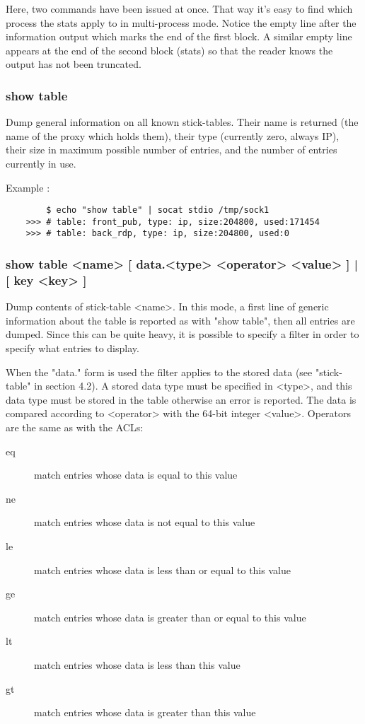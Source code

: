     Here, two commands have been issued at once. That way it's easy to find
    which process the stats apply to in multi-process mode. Notice the empty
    line after the information output which marks the end of the first block.
    A similar empty line appears at the end of the second block (stats) so that
    the reader knows the output has not been truncated.

\subsubsection[show table]{show table}
  Dump general information on all known stick-tables. Their name is returned
  (the name of the proxy which holds them), their type (currently zero, always
  IP), their size in maximum possible number of entries, and the number of
  entries currently in use.

  Example :
  \begin{verbatim}
        $ echo "show table" | socat stdio /tmp/sock1
    >>> # table: front_pub, type: ip, size:204800, used:171454
    >>> # table: back_rdp, type: ip, size:204800, used:0
  \end{verbatim}

\subsubsection[show table]{show table <name> [ data.<type> <operator> <value> ] | [ key <key> ]}
  Dump contents of stick-table <name>. In this mode, a first line of generic
  information about the table is reported as with "show table", then all
  entries are dumped. Since this can be quite heavy, it is possible to specify
  a filter in order to specify what entries to display.

  When the "data." form is used the filter applies to the stored data (see
  "stick-table" in section 4.2).  A stored data type must be specified
  in <type>, and this data type must be stored in the table otherwise an
  error is reported. The data is compared according to <operator> with the
  64-bit integer <value>.  Operators are the same as with the ACLs:

  \begin{description}
  \item[eq] match entries whose data is equal to this value
  \item[ne] match entries whose data is not equal to this value
  \item[le] match entries whose data is less than or equal to this value
  \item[ge] match entries whose data is greater than or equal to this value
  \item[lt] match entries whose data is less than this value
  \item[gt] match entries whose data is greater than this value
  \end{description}

